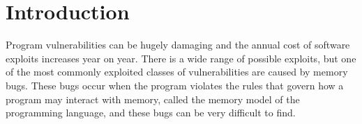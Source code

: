 \documentclass[12pt,twoside]{report}
\begin{document}



\clearpage{\pagestyle{empty}\cleardoublepage}
\setcounter{page}{1}
\pagestyle{fancy}




\tableofcontents 


\setcounter{page}{1}
\fancyhead[LE,RO]{\slshape \rightmark}
\fancyhead[LO,RE]{\slshape \leftmark}

\chapter{Introduction}

Program vulnerabilities can be hugely damaging and the annual cost of software exploits increases year on year. There is a wide range of possible exploits, but one of the most commonly exploited classes of vulnerabilities are caused by memory bugs. These bugs occur when the program violates the rules that govern how a program may interact with memory, called the memory model of the programming language, and these bugs can be very difficult to find. 
\end{document}
